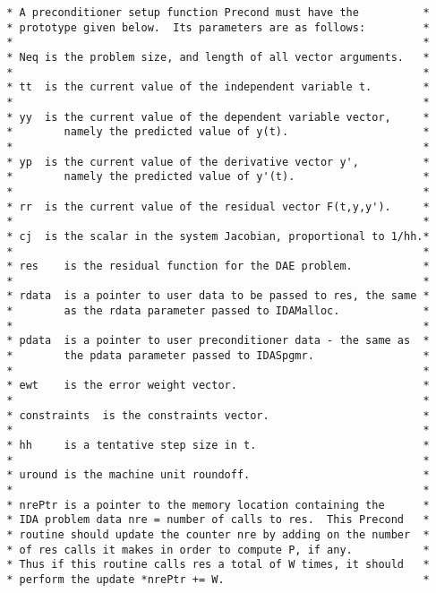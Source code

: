 \documentclass[11pt]{article}
\begin{document}
\begin{verbatim}
 * A preconditioner setup function Precond must have the          *
 * prototype given below.  Its parameters are as follows:         *
 *                                                                *
 * Neq is the problem size, and length of all vector arguments.   *
 *                                                                *
 * tt  is the current value of the independent variable t.        *
 *                                                                *
 * yy  is the current value of the dependent variable vector,     *
 *        namely the predicted value of y(t).                     *
 *                                                                *
 * yp  is the current value of the derivative vector y',          *
 *        namely the predicted value of y'(t).                    *
 *                                                                *
 * rr  is the current value of the residual vector F(t,y,y').     *
 *                                                                *
 * cj  is the scalar in the system Jacobian, proportional to 1/hh.*
 *                                                                *
 * res    is the residual function for the DAE problem.           *
 *                                                                *
 * rdata  is a pointer to user data to be passed to res, the same *
 *        as the rdata parameter passed to IDAMalloc.             *
 *                                                                *
 * pdata  is a pointer to user preconditioner data - the same as  *
 *        the pdata parameter passed to IDASpgmr.                 *
 *                                                                *
 * ewt    is the error weight vector.                             *
 *                                                                *
 * constraints  is the constraints vector.                        *
 *                                                                *
 * hh     is a tentative step size in t.                          *
 *                                                                *
 * uround is the machine unit roundoff.                           *
 *                                                                *
 * nrePtr is a pointer to the memory location containing the      *
 * IDA problem data nre = number of calls to res.  This Precond   *
 * routine should update the counter nre by adding on the number  *
 * of res calls it makes in order to compute P, if any.           *
 * Thus if this routine calls res a total of W times, it should   *
 * perform the update *nrePtr += W.                               *

\end{verbatim}
\end{document}
